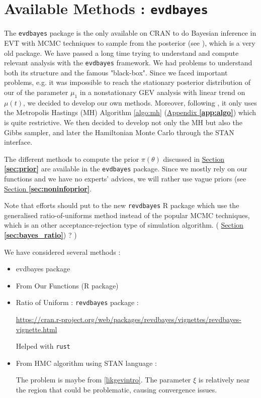 \section{Available Methods : \texttt{evdbayes}}

The \texttt{evdbayes} package is the only available on CRAN to do Bayesian inference in EVT with MCMC techniques to sample from the posterior (see \citet{ribatet_users_2006}), which is a very old package. We have passed a long time trying to understand and compute relevant analysis with the \texttt{evdbayes} framework. We had problems to understand both its structure and the famous "black-box".
 Since we faced important problems, e.g. it was impossible to reach the stationary posterior distribution of our of the parameter $\mu_1$ in a nonstationary GEV analysis with linear trend on $\mu(t)$, we decided to develop our own methods. Moreover, following \citet{hartmann_bayesian_2016}, it only uses the Metropolis Hastings (MH) Algorithm \ref{algo:mh} (\hyperref[app:algo]{Appendix \textbf{\ref{app:algo}}}) which is quite restrictive. We then decided to develop not only the MH but also the Gibbs sampler, and later the Hamiltonian Monte Carlo through the STAN interface. 

The different methods to compute the prior $\pi(\theta)$ discussed in \hyperref[sec:prior]{Section \textbf{\ref{sec:prior}}} are available in the \texttt{evdbayes} package. Since we mostly rely on our functions and we have no experts' advices, we will rather use vague priors (see \hyperref[sec:noninfoprior]{Section \textbf{\ref{sec:noninfoprior}}}. 


 Note that efforts should put to the new \texttt{revdbayes} R package which use the generalised ratio-of-uniforms method instead of the popular MCMC techniques, which is an other acceptance-rejection type of simulation algorithm. ( \hyperref[sec:bayes_ratio]{Section \textbf{\ref{sec:bayes_ratio}}}) ? )
 
 
 
 We have considered several methods : 
 
 \begin{itemize}
 	\item evdbayes package
 	\item From Our Functions (R package)
 	\item Ratio of Uniform : \texttt{revdbayes} package :
 	
 	\url{https://cran.r-project.org/web/packages/revdbayes/vignettes/revdbayes-vignette.html}
 	
 	Helped with \texttt{rust}
 	
 	\item From HMC algorithm using STAN language :
 	
 	The problem is maybe from \ref{likgevintro}. The parameter $\xi$ is relatively near the region that could be problematic, causing convergence issues. 
 	
 \end{itemize}

